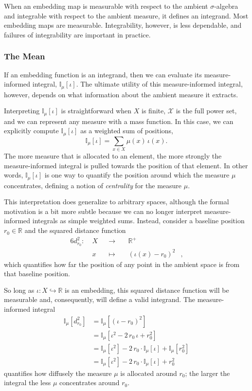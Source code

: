\documentclass[
  letterpaper,
  DIV=11,
  numbers=noendperiod]{scrartcl}
\begin{document}
When an embedding map is measurable with respect to the ambient
\(\sigma\)-algebra and integrable with respect to the ambient measure,
it defines an integrand. Most embedding maps are measurable.
Integrability, however, is less dependable, and failures of
integrability are important in practice.

\subsubsection{The Mean}\label{the-mean}

If an embedding function is an integrand, then we can evaluate its
measure-informed integral, \(\mathbb{I}_{\mu}[\iota]\). The ultimate
utility of this measure-informed integral, however, depends on what
information about the ambient measure it extracts.

Interpreting \(\mathbb{I}_{\mu}[\iota]\) is straightforward when \(X\)
is finite, \(\mathcal{X}\) is the full power set, and we can represent
any measure with a mass function. In this case, we can explicitly
compute \(\mathbb{I}_{\mu}[\iota]\) as a weighted sum of positions, \[
\mathbb{I}_{\mu}[\iota] = \sum_{x \in X} \mu(x) \, \iota(x).
\] The more measure that is allocated to an element, the more strongly
the measure-informed integral is pulled towards the position of that
element. In other words, \(\mathbb{I}_{\mu}[\iota]\) is one way to
quantify the position around which the measure \(\mu\) concentrates,
defining a notion of \emph{centrality} for the measure \(\mu\).

This interpretation does generalize to arbitrary spaces, although the
formal motivation is a bit more subtle because we can no longer
interpret measure-informed integrals as simple weighted sums. Instead,
consider a baseline position \(r_{0} \in \mathbb{R}\) and the squared
distance function \begin{alignat*}{6}
d_{r_{0}}^{2} :\; & X & &\rightarrow& \; &\mathbb{R}^{+}&
\\
& x & &\mapsto& & (\iota(x) - r_{0})^{2} &,
\end{alignat*} which quantifies how far the position of any point in the
ambient space is from that baseline position.

So long as \(\iota : X \hookrightarrow \mathbb{R}\) is an embedding,
this squared distance function will be measurable and, consequently,
will define a valid integrand. The measure-informed integral
\begin{align*}
\mathbb{I}_{\mu} \left[ d_{r_{0}}^{2} \right]
&=
\mathbb{I}_{\mu} \left[ (\iota - r_{0})^{2} \right]
\\
&=
\mathbb{I}_{\mu} \left[ \iota^{2} - 2 \, r_{0} \, \iota + r_{0}^{2} \right]
\\
&=
\mathbb{I}_{\mu} \left[ \iota^{2} \right]
-2 \, r_{0} \cdot \mathbb{I}_{\mu} \left[ \iota \right]
+ \mathbb{I}_{\mu} \left[ r_{0}^{2} \right]
\\
&=
\mathbb{I}_{\mu} \left[ \iota^{2} \right]
-2 \, r_{0} \cdot \mathbb{I}_{\mu} \left[ \iota \right]
+ r_{0}^{2}
\end{align*} quantifies how diffusely the measure \(\mu\) is allocated
around \(r_{0}\); the larger the integral the less \(\mu\) concentrates
around \(r_{0}\).
\end{document}
